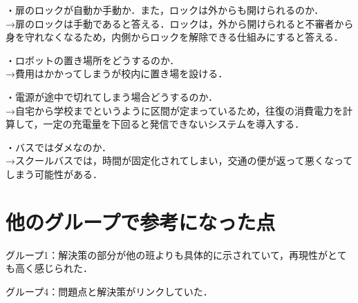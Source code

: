 \documentclass[uplatex]{jsarticle}
\begin{document}
・扉のロックが自動か手動か．また，ロックは外からも開けられるのか．
\\→扉のロックは手動であると答える．ロックは，外から開けられると不審者から身を守れなくなるため，内側からロックを解除できる仕組みにすると答える．

・ロボットの置き場所をどうするのか．
\\→費用はかかってしまうが校内に置き場を設ける．

・電源が途中で切れてしまう場合どうするのか．
\\→自宅から学校までというように区間が定まっているため，往復の消費電力を計算して，一定の充電量を下回ると発信できないシステムを導入する．

・バスではダメなのか．
\\→スクールバスでは，時間が固定化されてしまい，交通の便が返って悪くなってしまう可能性がある．


\section{他のグループで参考になった点}
グループ1：解決策の部分が他の班よりも具体的に示されていて，再現性がとても高く感じられた．

グループ4：問題点と解決策がリンクしていた．
\end{document}

